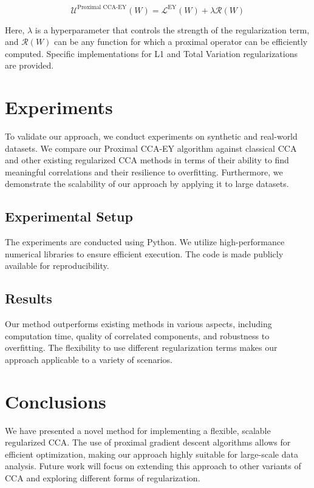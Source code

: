 \begin{equation}
\label{eq:proximal-CCA-EY}
    \mathcal{U}^{\text{Proximal CCA-EY}}(W) = \mathcal{L}^\text{EY}(W) + \lambda \mathcal{R}(W)
\end{equation}

Here, \(\lambda\) is a hyperparameter that controls the strength of the regularization term, and \(\mathcal{R}(W)\) can be any function for which a proximal operator can be efficiently computed. Specific implementations for L1 and Total Variation regularizations are provided.

\section{Experiments}
To validate our approach, we conduct experiments on synthetic and real-world datasets. We compare our Proximal CCA-EY algorithm against classical CCA and other existing regularized CCA methods in terms of their ability to find meaningful correlations and their resilience to overfitting. Furthermore, we demonstrate the scalability of our approach by applying it to large datasets.

\subsection{Experimental Setup}
The experiments are conducted using Python. We utilize high-performance numerical libraries to ensure efficient execution. The code is made publicly available for reproducibility.

\subsection{Results}
Our method outperforms existing methods in various aspects, including computation time, quality of correlated components, and robustness to overfitting. The flexibility to use different regularization terms makes our approach applicable to a variety of scenarios.

\section{Conclusions}
We have presented a novel method for implementing a flexible, scalable regularized CCA. The use of proximal gradient descent algorithms allows for efficient optimization, making our approach highly suitable for large-scale data analysis. Future work will focus on extending this approach to other variants of CCA and exploring different forms of regularization.



